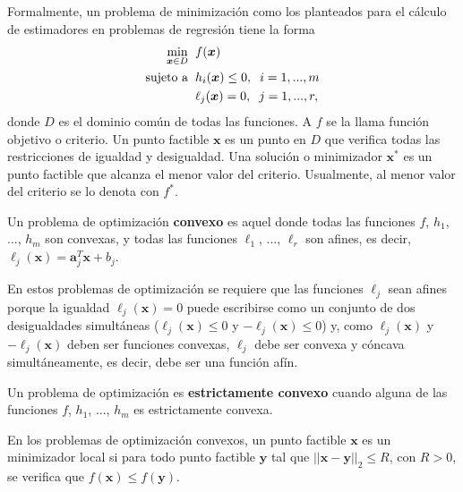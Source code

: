 \documentclass[a4paper,12pt]{report}
\begin{document}
Formalmente, un problema de minimización como los planteados para el cálculo de estimadores en problemas de regresión tiene la forma
\begin{align*}
\operatornamewithlimits{min}\limits_{\boldsymbol{x} \in D} \hspace{0.2cm} &f(\boldsymbol{x})\\
\text{sujeto a} \hspace{0.2cm} &h_i(\boldsymbol{x}) \leq 0, \hspace{0.2cm} i=1, ...,m\\
&\ell_j(\boldsymbol{x})=0, \hspace{0.2cm} j=1, ...,r,
\end{align*}
donde $D$ es el dominio común de todas las funciones. A $f$ se la llama función objetivo o criterio. Un punto factible $\boldsymbol{x}$ es un punto en $D$ que verifica todas las restricciones de igualdad y desigualdad. Una solución o minimizador $\boldsymbol{x}^*$ es un punto factible que alcanza el menor valor del criterio. Usualmente, al menor valor del criterio se lo denota con $f^*$.

Un problema de optimización \textbf{convexo} es aquel donde todas las funciones $f$, $h_1$, ..., $h_m$ son convexas, y todas las funciones $\ell_1$, ..., $\ell_r$ son afines, es decir, $\ell_j(\boldsymbol{x})=\boldsymbol{a}_j^T\boldsymbol{x}+b_j$.

En estos problemas de optimización se requiere que las funciones $\ell_j$ sean afines porque la igualdad $\ell_j(\boldsymbol{x})=0$ puede escribirse como un conjunto de dos desigualdades simultáneas ($\ell_j(\boldsymbol{x})\leq 0$ y $-\ell_j(\boldsymbol{x}) \leq 0$) y, como $\ell_j(\boldsymbol{x})$ y $-\ell_j(\boldsymbol{x})$ deben ser funciones convexas, $\ell_j$ debe ser convexa y cóncava simultáneamente, es decir, debe ser una función afín.

Un problema de optimización es \textbf{estrictamente convexo} cuando alguna de las funciones $f$, $h_1$, ..., $h_m$ es estrictamente convexa.

En los problemas de optimización convexos, un punto factible $\boldsymbol{x}$ es un minimizador local si para todo punto factible $\boldsymbol{y}$ tal que $||\boldsymbol{x}-\boldsymbol{y}||_2 \leq R$, con $R > 0$, se verifica que $f(\boldsymbol{x}) \leq f(\boldsymbol{y})$. 
\end{document}
